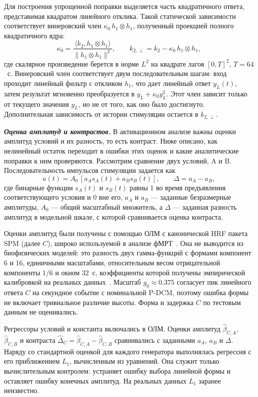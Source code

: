Для построения упрощенной поправки выделяется часть квадратичного ответа, представимая квадратом линейного отклика. Такой статической зависимости соответствует винеровский член $\kappa_0\,h_1\otimes h_1$, полученный проекцией полного квадратичного ядра:
\begin{equation}\label{eq:kappa}
\kappa_0=\frac{\langle k_2,h_1\otimes h_1\rangle}{\|h_1\otimes h_1\|^2},\qquad
k_{2,\perp}=k_2-\kappa_0\, h_1\otimes h_1,
\end{equation}
где скалярное произведение берется в норме $L^2$ на квадрате лагов $[0,T]^2$, $T=64$~с. Винеровский член соответствует двум последовательным шагам: вход проходит линейный фильтр с откликом $h_1$, что дает линейный ответ $y_L(t)$, затем результат мгновенно преобразуется в $y_L+\kappa_0 y_L^2$. Этот член зависит только от текущего значения $y_L$, но не от того, как оно было достигнуто. Дополнительная зависимость от истории стимуляции остается в $k_{2,\perp}$.

\textbf{\textit{Оценка амплитуд и контрастов.}} В активационном анализе важны оценки амплитуд условий и их разность, то есть контраст. Ниже описано, как нелинейный остаток переходит в ошибки этих оценок и какие аналитические поправки к ним проверяются. Рассмотрим сравнение двух условий, A и B. Последовательность импульсов стимуляции задается как
\begin{equation}\label{eq:input}
u(t)=A_0\,[a_A s_A(t)+a_B s_B(t)], \qquad
\Delta=a_A-a_B,
\end{equation}
где бинарные функции $s_A(t)$ и $s_B(t)$ равны 1 во время предъявления соответствующего условия и 0 вне его, $a_A$ и $a_B$ --- заданные безразмерные амплитуды, $A_0$ --- общий масштабный множитель, а $\Delta$ --- заданная разность амплитуд в модельной шкале, с которой сравнивается оценка контраста.

Оценки амплитуд были получены с помощью ОЛМ с канонической HRF пакета SPM (далее $C$), широко используемой в анализе фМРТ~\cite{masharipov2025,myznikov2026}. Она не выводится из биофизических моделей: это разность двух гамма-функций с формами компонент 6 и 16, единичными масштабами, относительным весом отрицательной компоненты $1/6$ и окном 32~с, коэффициенты которой получены эмпирической калибровкой на реальных данных~\cite{glover1999}. Масштаб $g_0\approx0.375$ согласует пик линейного ответа $C$ на секундное событие с номинальной P-DCM, поэтому ошибка формы не включает тривиальное различие высоты. Форма и задержка $C$ по тестовым данным не оценивались.

Регрессоры условий и константа включались в ОЛМ. Оценки амплитуд $\hat\beta_{C,A}$, $\hat\beta_{C,B}$ и контраста $\hat\Delta_C=\hat\beta_{C,A}-\hat\beta_{C,B}$ сравнивались с заданными $a_A$, $a_B$ и $\Delta$. Наряду со стандартной оценкой для каждого генератора выполнялась регрессия с его приближением $L_1$, вычисленным из уравнений. Она служит только вычислительным контролем: устраняет ошибку выбора линейной формы и оставляет ошибку конечных амплитуд. На реальных данных $L_1$ заранее неизвестно.

